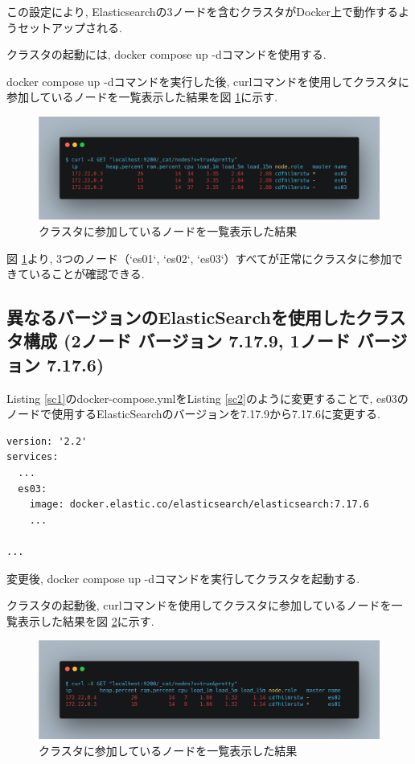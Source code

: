 \documentclass[a4j,12pt,]{jarticle}
\begin{document}
この設定により, Elasticsearchの3ノードを含むクラスタがDocker上で動作するようセットアップされる.

クラスタの起動には, docker compose up -dコマンドを使用する.

docker compose up -dコマンドを実行した後, curlコマンドを使用してクラスタに参加しているノードを一覧表示した結果を図 \ref{p1}に示す.

\begin{figure}[H]
  \begin{center}
    \includegraphics[width=160mm]{curl-same.png}
    \caption{クラスタに参加しているノードを一覧表示した結果}
    \label{p1}
  \end{center}
\end{figure}

図 \ref{p1}より, 3つのノード（`es01`, `es02`, `es03`）すべてが正常にクラスタに参加できていることが確認できる.

\subsection{異なるバージョンのElasticSearchを使用したクラスタ構成 (2ノード バージョン 7.17.9, 1ノード バージョン 7.17.6)}

Listing \ref{sc1}のdocker-compose.ymlをListing \ref{sc2}のように変更することで, es03のノードで使用するElasticSearchのバージョンを7.17.9から7.17.6に変更する.

\begin{lstlisting}[caption=Listing \ref{sc1}のdocker-compose.ymlから変更を加えた箇所, label=sc2]
version: '2.2'
services:
  ...
  es03:
    image: docker.elastic.co/elasticsearch/elasticsearch:7.17.6
    ...

...
\end{lstlisting}

変更後, docker compose up -dコマンドを実行してクラスタを起動する.

クラスタの起動後, curlコマンドを使用してクラスタに参加しているノードを一覧表示した結果を図 \ref{p2}に示す.

\begin{figure}[H]
  \begin{center}
    \includegraphics[width=160mm]{curl-different.png}
    \caption{クラスタに参加しているノードを一覧表示した結果}
    \label{p2}
  \end{center}
\end{figure}
\end{document}
